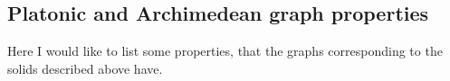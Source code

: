 
\begin{highlight}
\section*{Platonic and Archimedean graph properties}

Here I would like to list some properties, that the graphs corresponding to the solids described above have.

\end{highlight}

